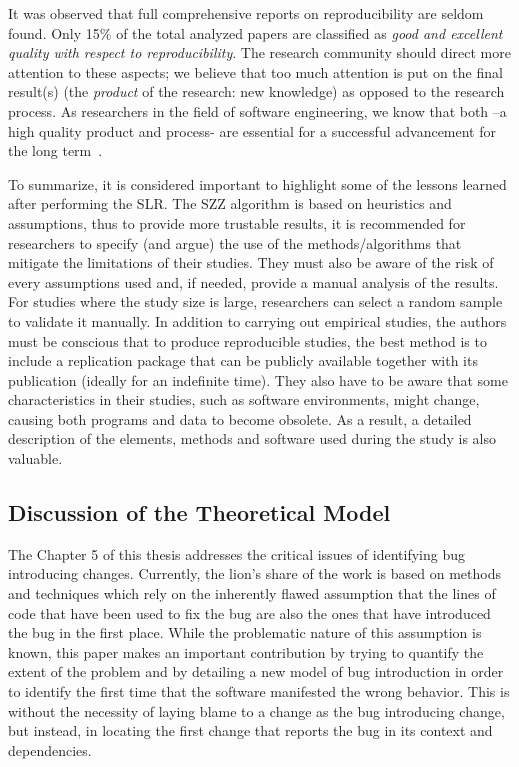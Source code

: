 \documentclass[a4paper, 12pt]{book}
\begin{document}
It was observed that full comprehensive reports on reproducibility are seldom found. Only 15\% of the total analyzed papers are classified as  \emph{good and excellent quality with respect to reproducibility}. The research community should direct more attention to these aspects; we believe that too much attention is put on the final result(s) (the \emph{product} of the research: new knowledge) as opposed to the research process. As researchers in the field of software engineering, we know that both --a high quality product and process- are essential for a successful advancement for the long term~\cite{kan2002metrics}.

To summarize, it is considered important to highlight some of the lessons learned after performing the SLR. The SZZ algorithm is based on heuristics and assumptions, thus to provide more trustable results, it is recommended for researchers to specify (and argue) the use of the methods/algorithms that mitigate the limitations of their studies. They must also be aware of the risk of every assumptions used and, if needed, provide a manual analysis of the results. For studies where the study size is large, researchers can select a random sample to validate it manually. In addition to carrying out empirical studies, the authors must be conscious that to produce reproducible studies, the best method is to include a replication package that can be publicly available together with its publication (ideally for an indefinite time). They also have to be aware that some characteristics in their studies, such as software environments, might change, causing both programs and data to become obsolete. As a result, a detailed description of the elements, methods and software used during the study is also valuable. 

\subsection{Discussion of the Theoretical Model}
\label{subsec:implicationsModel}

The Chapter 5 of this thesis addresses the critical issues of identifying bug introducing changes. Currently, the lion's share of the work is based on methods and techniques which rely on the inherently flawed assumption that the lines of code that have been used to fix the bug are also the ones that have introduced the bug in the first place. While the problematic nature of this assumption is known, this paper makes an important contribution by trying to quantify the extent of the problem and by detailing a new model of bug introduction in order to identify the first time that the software manifested the wrong behavior. This is without the necessity of laying blame to a change as the bug introducing change, but instead, in locating the first change that reports the bug in its context and dependencies.
\end{document}
